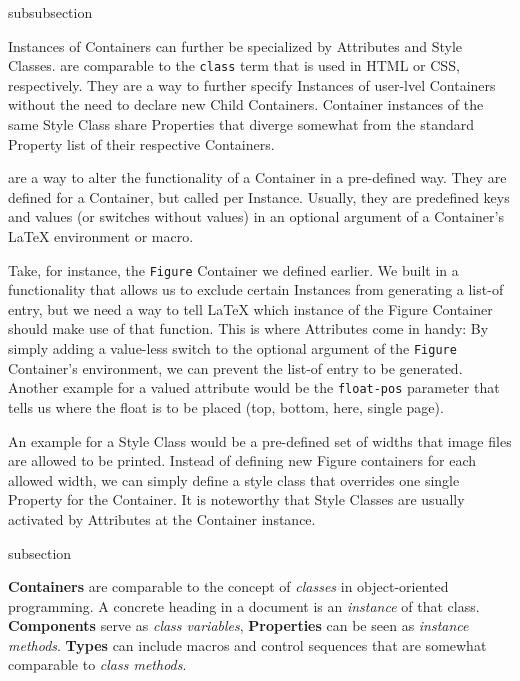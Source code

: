 \begin{Heading}[label=sec:overview.types]{subsubsection}
\end{Heading}

Instances of Containers can further be specialized by Attributes and
Style Classes.  are comparable to the
\texttt{class} term that is used in HTML or CSS, respectively.  They
are a way to further specify Instances of user-lvel Containers without
the need to declare new Child Containers. Container instances of the
same Style Class share Properties that diverge somewhat from the
standard Property list of their respective Containers.

 are a way to alter the functionality of a
Container in a pre-defined way. They are defined for a Container, but
called per Instance. Usually, they are predefined keys and values (or
switches without values) in an optional argument of a Container's
{\LaTeX} environment or macro.

Take, for instance, the \texttt{Figure} Container we defined
earlier. We built in a functionality that allows us to exclude certain
Instances from generating a list-of entry, but we need a way to tell
LaTeX which instance of the Figure Container should make use of that
function. This is where Attributes come in handy: By simply adding a
value-less switch to the optional argument of the \texttt{Figure}
Container's environment, we can prevent the list-of entry to be
generated. Another example for a valued attribute would be the
\texttt{float-pos} parameter that tells us where the float is to be
placed (top, bottom, here, single page).

An example for a Style Class would be a pre-defined set of widths that
image files are allowed to be printed. Instead of defining new Figure
containers for each allowed width, we can simply define a style class
that overrides one single Property for the Container. It is noteworthy
that Style Classes are usually activated by Attributes at the
Container instance.


\begin{Heading}[label=sec:oop]{subsection}
\end{Heading}

\textbf{Containers} are comparable to the concept of \textit{classes}
in object-oriented programming. A concrete heading in a document is an
\textit{instance} of that class. \textbf{Components} serve as
\textit{class variables}, \textbf{Properties} can be seen as
\textit{instance methods}. \textbf{Types} can include macros and
control sequences that are somewhat comparable to \textit{class
  methods}.

